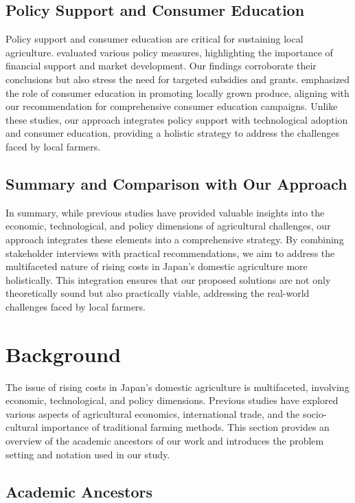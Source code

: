 \documentclass{article} %
\begin{document}
\subsection{Policy Support and Consumer Education}
Policy support and consumer education are critical for sustaining local agriculture. \citet{liu2023agentbench} evaluated various policy measures, highlighting the importance of financial support and market development. Our findings corroborate their conclusions but also stress the need for targeted subsidies and grants. \citet{shanahan2023role} emphasized the role of consumer education in promoting locally grown produce, aligning with our recommendation for comprehensive consumer education campaigns. Unlike these studies, our approach integrates policy support with technological adoption and consumer education, providing a holistic strategy to address the challenges faced by local farmers.

\subsection{Summary and Comparison with Our Approach}
In summary, while previous studies have provided valuable insights into the economic, technological, and policy dimensions of agricultural challenges, our approach integrates these elements into a comprehensive strategy. By combining stakeholder interviews with practical recommendations, we aim to address the multifaceted nature of rising costs in Japan's domestic agriculture more holistically. This integration ensures that our proposed solutions are not only theoretically sound but also practically viable, addressing the real-world challenges faced by local farmers.

\section{Background}
\label{sec:background}

The issue of rising costs in Japan's domestic agriculture is multifaceted, involving economic, technological, and policy dimensions. Previous studies have explored various aspects of agricultural economics, international trade, and the socio-cultural importance of traditional farming methods. This section provides an overview of the academic ancestors of our work and introduces the problem setting and notation used in our study.

\subsection{Academic Ancestors}
\end{document}
